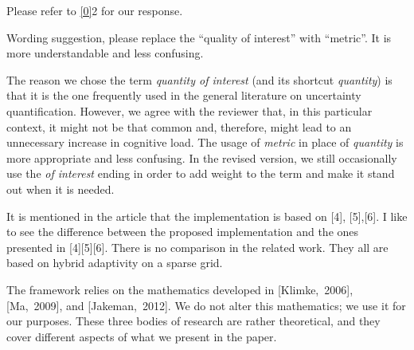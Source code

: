 \begin{authors}
Please refer to \cref{0}{2} for our response.

\begin{actions}
\end{actions}
\end{authors}

\begin{reviewer}
Wording suggestion, please replace the ``quality of interest'' with ``metric''.
It is more understandable and less confusing.
\end{reviewer}

\begin{authors}
The reason we chose the term \emph{quantity of interest} (and its shortcut
\emph{quantity}) is that it is the one frequently used in the general literature
on uncertainty quantification. However, we agree with the reviewer that, in this
particular context, it might not be that common and, therefore, might lead to an
unnecessary increase in cognitive load. The usage of \emph{metric} in place of
\emph{quantity} is more appropriate and less confusing. In the revised version,
we still occasionally use the \emph{of interest} ending in order to add weight
to the term and make it stand out when it is needed.

\begin{actions}
\end{actions}
\end{authors}

\begin{reviewer}
It is mentioned in the article that the implementation is  based on [4],
[5],[6]. I like to see the difference between the proposed implementation and
the ones presented in [4][5][6]. There is no comparison in the related work.
They all are based on hybrid adaptivity on a sparse grid.
\end{reviewer}

\begin{authors}
The framework relies on the mathematics developed in [Klimke,~2006], [Ma,~2009],
and [Jakeman,~2012]. We do not alter this mathematics; we use it for our
purposes. These three bodies of research are rather theoretical, and they cover
different aspects of what we present in the paper.

\begin{actions}
\end{actions}
\end{authors}

